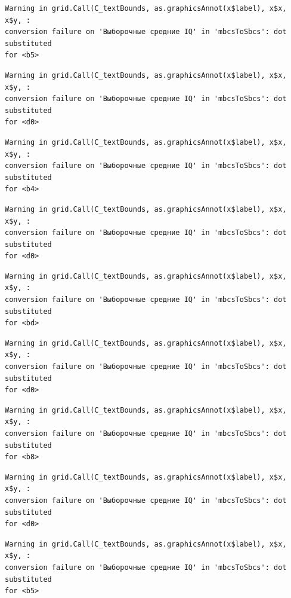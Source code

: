 \documentclass[
  letterpaper,
]{scrbook}
\theoremstyle{definition}
\theoremstyle{remark}
\begin{document}
\begin{verbatim}
Warning in grid.Call(C_textBounds, as.graphicsAnnot(x$label), x$x, x$y, :
conversion failure on 'Выборочные средние IQ' in 'mbcsToSbcs': dot substituted
for <b5>
\end{verbatim}

\begin{verbatim}
Warning in grid.Call(C_textBounds, as.graphicsAnnot(x$label), x$x, x$y, :
conversion failure on 'Выборочные средние IQ' in 'mbcsToSbcs': dot substituted
for <d0>
\end{verbatim}

\begin{verbatim}
Warning in grid.Call(C_textBounds, as.graphicsAnnot(x$label), x$x, x$y, :
conversion failure on 'Выборочные средние IQ' in 'mbcsToSbcs': dot substituted
for <b4>
\end{verbatim}

\begin{verbatim}
Warning in grid.Call(C_textBounds, as.graphicsAnnot(x$label), x$x, x$y, :
conversion failure on 'Выборочные средние IQ' in 'mbcsToSbcs': dot substituted
for <d0>
\end{verbatim}

\begin{verbatim}
Warning in grid.Call(C_textBounds, as.graphicsAnnot(x$label), x$x, x$y, :
conversion failure on 'Выборочные средние IQ' in 'mbcsToSbcs': dot substituted
for <bd>
\end{verbatim}

\begin{verbatim}
Warning in grid.Call(C_textBounds, as.graphicsAnnot(x$label), x$x, x$y, :
conversion failure on 'Выборочные средние IQ' in 'mbcsToSbcs': dot substituted
for <d0>
\end{verbatim}

\begin{verbatim}
Warning in grid.Call(C_textBounds, as.graphicsAnnot(x$label), x$x, x$y, :
conversion failure on 'Выборочные средние IQ' in 'mbcsToSbcs': dot substituted
for <b8>
\end{verbatim}

\begin{verbatim}
Warning in grid.Call(C_textBounds, as.graphicsAnnot(x$label), x$x, x$y, :
conversion failure on 'Выборочные средние IQ' in 'mbcsToSbcs': dot substituted
for <d0>
\end{verbatim}

\begin{verbatim}
Warning in grid.Call(C_textBounds, as.graphicsAnnot(x$label), x$x, x$y, :
conversion failure on 'Выборочные средние IQ' in 'mbcsToSbcs': dot substituted
for <b5>
\end{verbatim}
\end{document}
